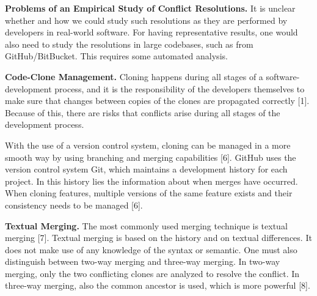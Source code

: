 \textbf{Problems of an Empirical Study of Conflict Resolutions.} It is unclear whether and how we could study such resolutions as they are performed by developers in real-world software. For having representative results, one would also need to study the resolutions in large codebases, such as from GitHub/BitBucket. This requires some automated analysis.

\textbf{Code-Clone Management.} Cloning happens during all stages of a software-development process, and it is the responsibility of the developers themselves to make sure that changes between copies of the clones are propagated correctly [1]. Because of this, there are risks that conflicts arise during all stages of the development process.

With the use of a version control system, cloning can be managed in a more smooth way by using branching and merging capabilities [6]. GitHub uses the version control system Git, which maintains a development history for each project. In this history lies the information about when merges have occurred. When cloning features, multiple versions of the same feature exists and their consistency needs to be managed [6].

\textbf{Textual Merging.} The most commonly used merging technique is textual merging [7]. Textual merging is based on the history and on textual differences. It does not make use of any knowledge of the syntax or semantic. One must also distinguish between two-way merging and three-way merging. In two-way merging, only the two conflicting clones are analyzed to resolve the conflict. In three-way merging, also the common ancestor is used, which is more powerful [8].

